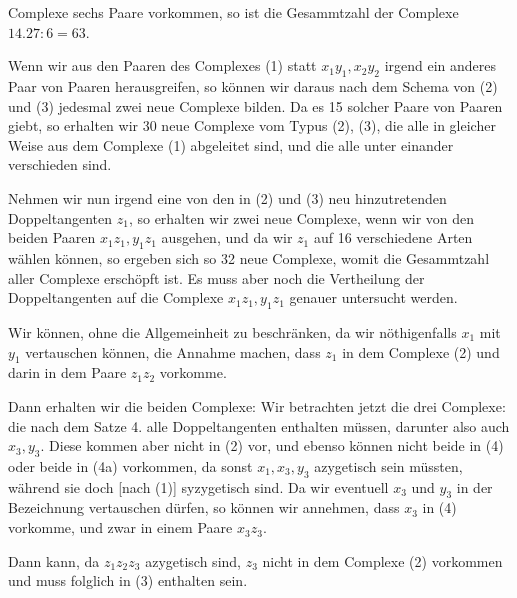 Complexe sechs Paare vorkommen, so ist die Gesammtzahl der Complexe $14.27 : 6 = 63$.


Wenn wir aus den Paaren des Complexes (1) statt $x_1 y_1, x_2 y_2$ irgend ein anderes Paar von Paaren herausgreifen, so können wir daraus nach dem Schema von (2) und (3) jedesmal zwei neue Complexe bilden. Da es 15 solcher Paare von Paaren giebt, so erhalten wir 30 neue Complexe vom Typus (2), (3), die alle in gleicher Weise aus dem Complexe (1) abgeleitet sind, und die alle unter einander verschieden sind.

Nehmen wir nun irgend eine von den in (2) und (3) neu hinzutretenden Doppeltangenten $z_1$, so erhalten wir zwei neue Complexe, wenn wir von den beiden Paaren $x_1 z_1, y_1 z_1$ ausgehen, und da wir $z_1$ auf 16 verschiedene Arten wählen können, so ergeben sich so 32 neue Complexe, womit die Gesammtzahl aller Complexe erschöpft ist. Es muss aber noch die Vertheilung der Doppeltangenten auf die Complexe $x_1 z_1, y_1 z_1$ genauer untersucht werden.

Wir können, ohne die Allgemeinheit zu beschränken, da wir n\"othigenfalls $x_1$ mit $y_1$ vertauschen können, die Annahme machen, dass $z_1$ in dem Complexe (2) und darin in dem Paare $z_1 z_2$ vorkomme.

Dann erhalten wir die beiden Complexe:
Wir betrachten jetzt die drei Complexe:
die nach dem Satze 4. alle Doppeltangenten enthalten müssen, darunter also auch $x_3, y_3$. Diese kommen aber nicht in (2) vor, und ebenso können nicht beide in (4) oder beide in (4a) vorkommen, da sonst $x_1, x_3, y_3$ azygetisch sein müssten, während sie doch [nach (1)] syzygetisch sind. Da wir eventuell $x_3$ und $y_3$ in der Bezeichnung vertauschen dürfen, so können wir annehmen, dass $x_3$ in (4) vorkomme, und zwar in einem Paare $x_3 z_3$.

Dann kann, da $z_1 z_2 z_3$ azygetisch sind, $z_3$ nicht in dem Complexe (2) vorkommen und muss folglich in (3) enthalten sein.

